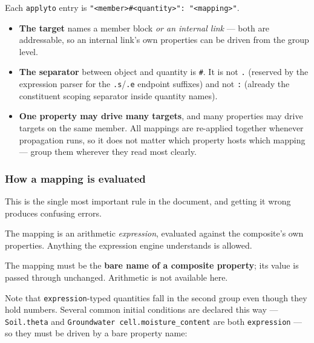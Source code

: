 \documentclass[11pt,a4paper]{article}
\newcommand{\code}[1]{\texttt{\small #1}}
\begin{document}
Each \code{applyto} entry is \code{"<member>\#<quantity>": "<mapping>"}.

\begin{itemize}[leftmargin=1.4em]
\item \textbf{The target} names a member block \emph{or an internal link} ---
both are addressable, so an internal link's own properties can be driven from
the group level.
\item \textbf{The separator} between object and quantity is \code{\#}. It is
not \code{.} (reserved by the expression parser for the \code{.s}/\code{.e}
endpoint suffixes) and not \code{:} (already the constituent scoping separator
inside quantity names).
\item \textbf{One property may drive many targets}, and many properties may
drive targets on the same member. All mappings are re-applied together whenever
propagation runs, so it does not matter which property hosts which mapping ---
group them wherever they read most clearly.
\end{itemize}

\subsubsection{How a mapping is evaluated}\label{sec:eval}

This is the single most important rule in the document, and getting it wrong
produces confusing errors.

\begin{description}[style=nextline,leftmargin=1.2em]
\item[Numeric targets --- types \code{value}, \code{balance}, \code{constant}.]
The mapping is an arithmetic \emph{expression}, evaluated against the
composite's own properties. Anything the expression engine understands is
allowed.
\item[Every other target --- \code{source}, \code{timeseries}, \code{string},
\code{boolean}, \code{expression}.]
The mapping must be the \textbf{bare name of a composite property}; its value
is passed through unchanged. Arithmetic is not available here.
\end{description}

\noindent
Note that \code{expression}-typed quantities fall in the second group even
though they hold numbers. Several common initial conditions are declared this
way --- \code{Soil.theta} and \code{Groundwater cell.moisture\_content} are
both \code{expression} --- so they must be driven by a bare property name:
\end{document}

